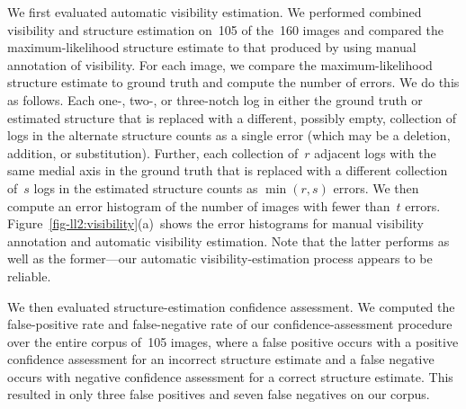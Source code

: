 We first evaluated automatic visibility estimation.
%
We performed combined visibility and structure estimation on~105 of the~160
images and compared the maximum-likelihood structure estimate to that produced
by  using manual annotation of visibility.
%
For each image, we compare the maximum-likelihood structure estimate to ground
truth and compute the number of errors.
%
We do this as follows.
%
Each one-, two-, or three-notch log in either the ground truth or estimated structure
that is replaced with a different, possibly empty, collection of logs in the
alternate structure counts as a single error (which may be a deletion,
addition, or substitution).
%
Further, each collection of~$r$ adjacent logs with the same medial axis in
the ground truth that is replaced with a different collection of~$s$ logs in
the estimated structure counts as $\min(r,s)$ errors.
%
We then compute an error histogram of the number of images with fewer than~$t$
errors.
%
Figure~\ref{fig-ll2:visibility}(a)~shows the error histograms for manual visibility
annotation and automatic visibility estimation.
%
Note that the latter performs as well as the former---our automatic
visibility-estimation process appears to be reliable.

We then evaluated structure-estimation confidence assessment.
%
We computed the false-positive rate and false-negative rate of our
confidence-assessment procedure over the entire corpus of~105 images, where a
false positive occurs with a positive confidence assessment for an
incorrect structure estimate and a false negative occurs with negative
confidence assessment for a correct structure estimate.
%
This resulted in only three false positives and seven false negatives on our corpus.

